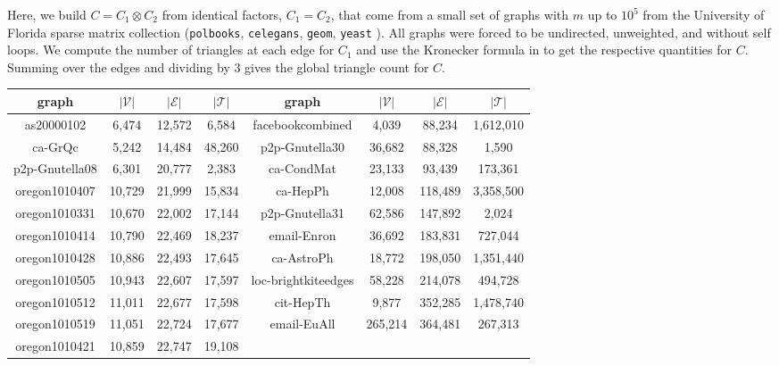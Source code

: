 \documentclass[10]{report}
\begin{document}
Here, we build $C = C_1 \otimes C_2$ from identical factors, $C_1=C_2$, that come from a small set of  graphs with $m$ up to $10^5$ from the University of Florida sparse matrix collection ({\tt polbooks}, {\tt celegans}, {\tt geom}, {\tt yeast} \cite{davis2011university}). 
All graphs were forced to be undirected, unweighted, and without self loops.  
We compute the number of triangles at each edge for $C_1$ and use the Kronecker formula in \cite{sanders2018large} to get the respective quantities for $C$.
Summing over the edges and dividing by 3 gives the global triangle count for $C$.




\begin{table}[htbp]
\begin{center}
\begin{tabular}{|c|c|c|c|c|c|c|c|}
\hline
\textbf{graph} & $|\mathcal{V}|$ & $|\mathcal{E}|$ & $|\mathcal{T}|$ & \textbf{graph} & $|\mathcal{V}|$ & $|\mathcal{E}|$ & $|\mathcal{T}|$  \\
\hline
\hline
as20000102 & 6,474 & 12,572 & 6,584 & 
facebookcombined & 4,039 & 88,234 & 1,612,010  \\
\hline
ca-GrQc & 5,242 & 14,484 & 48,260 & 
p2p-Gnutella30 & 36,682 & 88,328 & 1,590 \\
\hline
p2p-Gnutella08 & 6,301 & 20,777 & 2,383 & 
ca-CondMat & 23,133 & 93,439 & 173,361 \\
\hline
oregon1010407 & 10,729 & 21,999 & 15,834 & 
ca-HepPh & 12,008 & 118,489 & 3,358,500 \\
\hline
oregon1010331 &10,670 &  22,002 & 17,144 & 
p2p-Gnutella31 & 62,586 & 147,892 & 2,024 \\
\hline
oregon1010414 & 10,790 &  22,469 & 18,237 & 
email-Enron & 36,692 & 183,831 & 727,044 \\
\hline
oregon1010428 & 10,886 & 22,493 & 17,645 & 
ca-AstroPh & 18,772 & 198,050 & 1,351,440 \\
\hline
oregon1010505 & 10,943 & 22,607 & 17,597 & 
loc-brightkiteedges & 58,228 & 214,078 & 494,728 \\
\hline
oregon1010512 & 11,011 & 22,677 & 17,598 & 
cit-HepTh & 9,877 & 352,285 & 1,478,740 \\
\hline
oregon1010519 & 11,051 & 22,724 & 17,677 & 
email-EuAll & 265,214 & 364,481 & 267,313  \\
\hline
oregon1010421 & 10,859 & 22,747 & 19,108 & 

\end{tabular}
\end{center}
\end{table}
\end{document}

